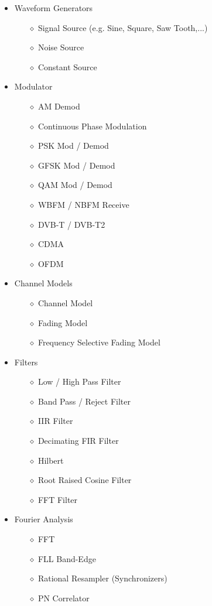 \begin{itemize}
\item Waveform Generators 
	\begin{itemize}
		\item[$\diamond$] Signal Source (e.g. Sine, Square, Saw Tooth,...)
		\item[$\diamond$] Noise Source
		\item[$\diamond$] Constant Source
	\end{itemize}
\item Modulator
	\begin{itemize}
		\item[$\diamond$] AM Demod
		\item[$\diamond$] Continuous Phase Modulation
		\item[$\diamond$] PSK Mod / Demod
		\item[$\diamond$] GFSK Mod / Demod
		\item[$\diamond$] QAM Mod / Demod
		\item[$\diamond$] WBFM / NBFM Receive
		\item[$\diamond$] DVB-T / DVB-T2
		\item[$\diamond$] CDMA \cite{Kavitha2015}
		\item[$\diamond$] OFDM \cite{Bloessl2013}
	\end{itemize}
\item  Channel Models 
	\begin{itemize}
		\item[$\diamond$] Channel Model
		\item[$\diamond$] Fading Model
		\item[$\diamond$] Frequency Selective Fading Model
	\end{itemize}
\item Filters
	\begin{itemize}
		\item[$\diamond$] Low / High Pass Filter
		\item[$\diamond$] Band Pass / Reject Filter
		\item[$\diamond$] IIR Filter
		\item[$\diamond$] Decimating FIR Filter
		\item[$\diamond$] Hilbert
		\item[$\diamond$] Root Raised Cosine Filter
		\item[$\diamond$] FFT Filter
	\end{itemize}
\item Fourier Analysis 
	\begin{itemize}
		\item[$\diamond$] FFT
		\item[$\diamond$] FLL Band-Edge
		\item[$\diamond$] Rational Resampler (Synchronizers)
		\item[$\diamond$] PN Correlator
	\end{itemize}
\end{itemize}

